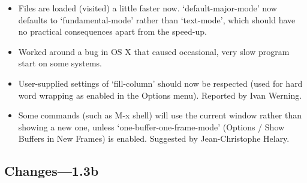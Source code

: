 \begin{itemize}
\item Files are loaded (visited) a little faster now.  `default-major-mode' now defaults to `fundamental-mode' rather than `text-mode', which should have no practical consequences apart from the speed-up. 

\item Worked around a bug in OS X that caused occasional, very slow program start on some systems.

\item User-supplied settings of `fill-column' should now be   respected (used for hard word wrapping as enabled in the   Options menu). Reported by Ivan Werning.

\item Some commands (such as M-x shell) will use the current window rather than showing a new one, unless `one-buffer-one-frame-mode' (Options / Show Buffers in New Frames) is enabled.  Suggested by Jean-Christophe Helary.

\end{itemize}

\subsection{Changes---1.3b}

